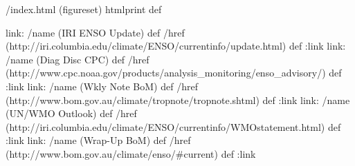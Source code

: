 /index.html {(figureset) htmlprint} def
\begin{ingrid}
link:
/name (IRI ENSO Update) def /href (http://iri.columbia.edu/climate/ENSO/currentinfo/update.html) def
:link
link:
/name (Diag Disc CPC) def
/href (http://www.cpc.noaa.gov/products/analysis_monitoring/enso_advisory/) def
:link
link:
/name (Wkly Note BoM) def
/href (http://www.bom.gov.au/climate/tropnote/tropnote.shtml) def
:link
link:
/name (UN/WMO Outlook) def
/href (http://iri.columbia.edu/climate/ENSO/currentinfo/WMOstatement.html) def
:link
link:
/name (Wrap-Up BoM) def
/href (http://www.bom.gov.au/climate/enso/#current) def
:link
\end{ingrid}
